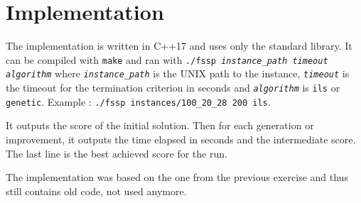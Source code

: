 \documentclass[a4paper]{article}
\begin{document}
\section{Implementation}

The implementation is written in C++17 and uses only the standard library. It can be compiled with \texttt{make} and ran with \texttt{./fssp \textit{instance\_path timeout algorithm}} where \texttt{\textit{instance\_path}} is the UNIX path to the instance, \texttt{\textit{timeout}} is the timeout for the termination criterion in seconds and \texttt{\textit{algorithm}} is \texttt{ils} or \texttt{genetic}.
Example : \texttt{./fssp instances/100\_20\_28 200 ils}.

It outputs the score of the initial solution. Then for each generation or improvement, it outputs the time elapsed in seconds and the intermediate score. The last line is the best achieved score for the run.

The implementation was based on the one from the previous exercise and thus still contains old code, not used anymore.




\end{document}
